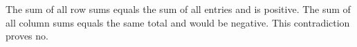The sum of all row sums equals the sum of all entries and is positive. The sum of all column sums equals the same total and would be negative. This contradiction proves $\boxed{\text{no}}$.
